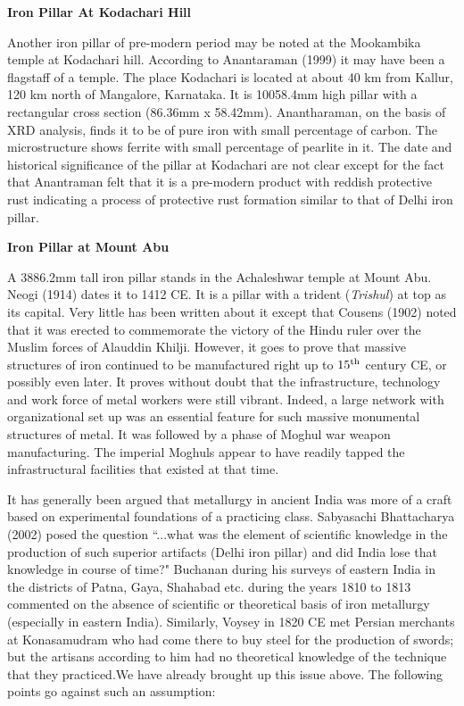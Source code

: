 \noindent \textbf{\large Iron Pillar At Kodachari Hill}

Another iron pillar of pre-modern period may be noted at the Mookambika temple at Kodachari hill. According to Anantaraman (1999) it may have been a flagstaff of a temple. The place Kodachari is located at about 40 km from Kallur, 120 km north of Mangalore, Karnataka. It is 10058.4mm high pillar with a rectangular cross section (86.36mm x 58.42mm). Anantharaman, on the basis of XRD analysis, finds it to be of pure iron with small percentage of carbon. The microstructure shows ferrite with small percentage of pearlite in it. The date and historical significance of the pillar at Kodachari are not clear except for the fact that Anantraman felt that it is a pre-modern product with reddish protective rust indicating a process of protective rust formation similar to that of Delhi iron pillar.

\newpage

\noindent \textbf{\large Iron Pillar at Mount Abu}

A 3886.2mm tall iron pillar stands in the Achaleshwar temple at Mount Abu. Neogi (1914) dates it to 1412 CE. It is a pillar with a trident ({\it Trishul}) at top as its capital. Very little has been written about it except that Cousens (1902) noted that it was erected to commemorate the victory of the Hindu ruler over the Muslim forces of Alauddin Khilji. However, it goes to prove that massive structures of iron continued to be manufactured right up to $15^{\rm th}$ century CE, or possibly even later. It proves without doubt that the infrastructure, technology and work force of metal workers were still vibrant. Indeed, a large network with organizational set up was an essential feature for such massive monumental structures of metal. It was followed by a phase of Moghul war weapon manufacturing. The imperial Moghuls appear to have readily tapped the infrastructural facilities that existed at that time.

It has generally been argued that metallurgy in ancient India was more of a craft based on experimental foundations of a practicing class. Sabyasachi Bhattacharya (2002) posed the question “...what was the element of scientific knowledge in the production of such superior artifacts (Delhi iron pillar) and did India lose that knowledge in course of time?" Buchanan during his surveys of eastern India in the districts of Patna, Gaya, Shahabad etc. during the years 1810 to 1813 commented on the absence of scientific or theoretical basis of iron metallurgy (especially in eastern India). Similarly, Voysey in 1820 CE met Persian merchants at Konasamudram who had come there to buy steel for the production of swords; but the artisans according to him had no theoretical knowledge of the technique that they practiced.We have already brought up this issue above. The following points go against such an assumption:


